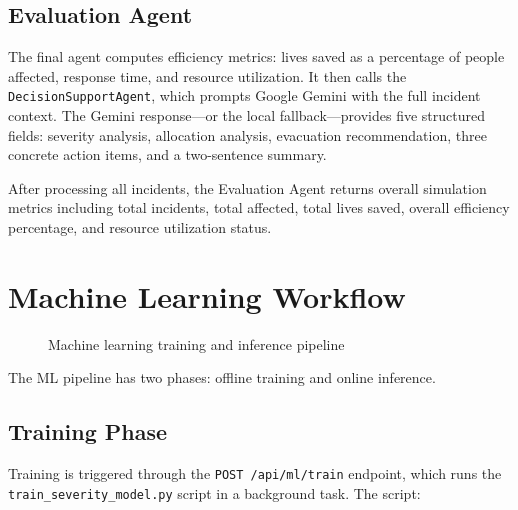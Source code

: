 \subsection{Evaluation Agent}

The final agent computes efficiency metrics: lives saved as a percentage of people affected, response time, and resource utilization. It then calls the \texttt{DecisionSupportAgent}, which prompts Google Gemini with the full incident context. The Gemini response---or the local fallback---provides five structured fields: severity analysis, allocation analysis, evacuation recommendation, three concrete action items, and a two-sentence summary.

After processing all incidents, the Evaluation Agent returns overall simulation metrics including total incidents, total affected, total lives saved, overall efficiency percentage, and resource utilization status.

\section{Machine Learning Workflow}
\label{sec:ml_workflow}

\begin{figure}[H]
\centering
{}
\caption{Machine learning training and inference pipeline}
\label{fig:ml_pipeline}
\end{figure}

The ML pipeline has two phases: offline training and online inference.

\subsection{Training Phase}

Training is triggered through the \texttt{POST /api/ml/train} endpoint, which runs the \texttt{train\_severity\_model.py} script in a background task. The script:

